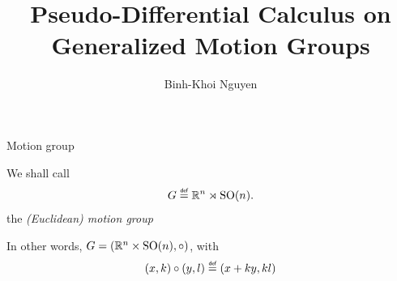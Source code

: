 \documentclass{beamer}
\title{Pseudo-Differential Calculus on Generalized Motion Groups}
\author{Binh-Khoi Nguyen}
\begin{document}
\maketitle

\begin{frame}{Motion group}
    \begin{definition}
        We shall call
        \begin{align*}
            \Group \defeq \R^n \rtimes \SpecialOrthogonalGroup n.
        \end{align*}
        the \emph{(Euclidean) motion group}
    \end{definition}

    \pause

    In other words, $G = (\mathbb{R}^n \times {\mathrm{SO} (n)}, \circ)$,
    with
    \begin{align*}
        (x, k) \circ (y, l) \defeq (x + k y, k l)
    \end{align*}
\end{frame}
\end{document}
